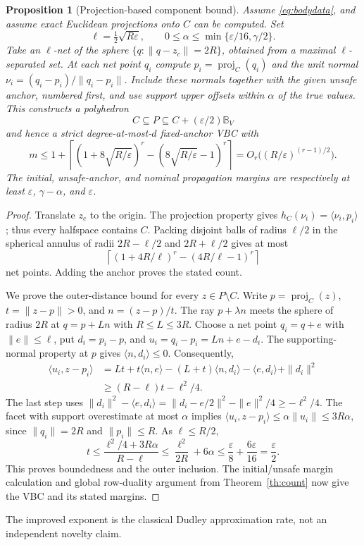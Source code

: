 \documentclass[10pt,letterpaper]{article}
\newtheorem{proposition}{Proposition}
\theoremstyle{remark}
\newcommand{\ball}{\mathbb B_V}
\begin{document}
\begin{proposition}[Projection-based component bound]\label{prop:projection}
Assume \eqref{eq:bodydata}, and assume exact Euclidean projections onto $C$ can be computed. Set
\[
 \ell=\tfrac12\sqrt{R\varepsilon},\qquad
 0\leq\alpha\leq\min\{\varepsilon/16,\gamma/2\}.
\]
Take an $\ell$-net of the sphere $\{q:\|q-z_c\|=2R\}$, obtained from a maximal $\ell$-separated set. At each net point $q_i$ compute $p_i=\operatorname{proj}_C(q_i)$ and the unit normal
$\nu_i=(q_i-p_i)/\|q_i-p_i\|$. Include these normals together with the given unsafe anchor, numbered first, and use support upper offsets within $\alpha$ of the true values. This constructs a polyhedron
\[
 C\subseteq P\subseteq C+(\varepsilon/2)\ball
\]
and hence a strict degree-at-most-$d$ fixed-anchor VBC with
\begin{equation}\label{eq:projection-count}
 m\leq1+\left\lceil
 (1+8\sqrt{R/\varepsilon})^r-
 (8\sqrt{R/\varepsilon}-1)^r
 \right\rceil
 =O_r\bigl((R/\varepsilon)^{(r-1)/2}\bigr).
\end{equation}
The initial, unsafe-anchor, and nominal propagation margins are respectively at least $\varepsilon$, $\gamma-\alpha$, and $\varepsilon$.
\end{proposition}
\begin{proof}
Translate $z_c$ to the origin. The projection property gives
$h_C(\nu_i)=\langle \nu_i,p_i\rangle$; thus every halfspace contains $C$.
Packing disjoint balls of radius $\ell/2$ in the spherical annulus of radii $2R-\ell/2$ and $2R+\ell/2$ gives at most
\[
 \left\lceil(1+4R/\ell)^r-(4R/\ell-1)^r\right\rceil
\]
net points. Adding the anchor proves the stated count.

We prove the outer-distance bound for every $z\in P\setminus C$.
Write $p=\operatorname{proj}_C(z)$, $t=\|z-p\|>0$, and $n=(z-p)/t$.
The ray $p+\lambda n$ meets the sphere of radius $2R$ at
$q=p+Ln$ with $R\leq L\leq3R$.
Choose a net point $q_i=q+e$ with $\|e\|\leq\ell$, put $d_i=p_i-p$, and
$u_i=q_i-p_i=Ln+e-d_i$.
The supporting-normal property at $p$ gives $\langle n,d_i\rangle\leq0$.
Consequently,
\begin{align*}
 \langle u_i,z-p_i\rangle
 &=Lt+t\langle n,e\rangle-(L+t)\langle n,d_i\rangle
       -\langle e,d_i\rangle+\|d_i\|^2\\
 &\geq (R-\ell)t-\ell^2/4.
\end{align*}
The last step uses
$\|d_i\|^2-\langle e,d_i\rangle
=\|d_i-e/2\|^2-\|e\|^2/4\geq-\ell^2/4$.
The facet with support overestimate at most $\alpha$ implies
$\langle u_i,z-p_i\rangle\leq\alpha\|u_i\|\leq3R\alpha$,
since $\|q_i\|=2R$ and $\|p_i\|\leq R$.
As $\ell\leq R/2$,
\[
 t\leq\frac{\ell^2/4+3R\alpha}{R-\ell}
 \leq\frac{\ell^2}{2R}+6\alpha
 \leq\frac{\varepsilon}{8}+\frac{6\varepsilon}{16}
 =\frac{\varepsilon}{2}.
\]
This proves boundedness and the outer inclusion. The initial/unsafe margin calculation and global row-duality argument from Theorem~\ref{th:count} now give the VBC and its stated margins.
\end{proof}
The improved exponent is the classical Dudley approximation rate, not an independent novelty claim.
\end{document}
